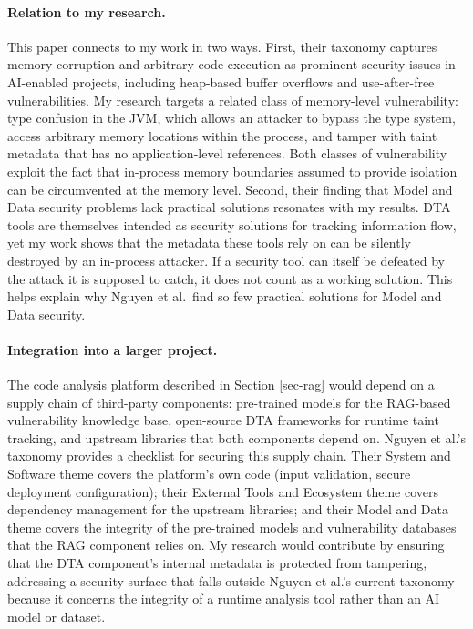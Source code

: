 \documentclass[a4paper,11pt]{article}
\theoremstyle{plain}
\begin{document}
\paragraph{Relation to my research.}
This paper connects to my work in two ways. 
First, their taxonomy captures memory corruption and arbitrary code execution as prominent security issues in AI-enabled projects, including heap-based buffer overflows and use-after-free vulnerabilities. My research targets a related class of memory-level vulnerability: type confusion in the JVM, which allows an attacker to bypass the type system, access arbitrary memory locations within the process, and tamper with taint metadata that has no application-level references. Both classes of vulnerability exploit the fact that in-process memory boundaries assumed to provide isolation can be circumvented at the memory level.
Second, their finding that Model and Data security problems lack practical solutions resonates with my results. DTA tools are themselves intended as security solutions for tracking information flow, yet my work shows that the metadata these tools rely on can be silently destroyed by an in-process attacker. If a security tool can itself be defeated by the attack it is supposed to catch, it does not count as a working solution. This helps explain why Nguyen et al.\ find so few practical solutions for Model and Data security.

\paragraph{Integration into a larger project.}
The code analysis platform described in Section \ref{sec-rag} would depend on a supply chain of third-party components: pre-trained models for the RAG-based vulnerability knowledge base, open-source DTA frameworks for runtime taint tracking, and upstream libraries that both components depend on. Nguyen et al.'s taxonomy provides a checklist for securing this supply chain. Their System and Software theme covers the platform's own code (input validation, secure deployment configuration); their External Tools and Ecosystem theme covers dependency management for the upstream libraries; and their Model and Data theme covers the integrity of the pre-trained models and vulnerability databases that the RAG component relies on. My research would contribute by ensuring that the DTA component's internal metadata is protected from tampering, addressing a security surface that falls outside Nguyen et al.'s current taxonomy because it concerns the integrity of a runtime analysis tool rather than an AI model or dataset.
\end{document}
